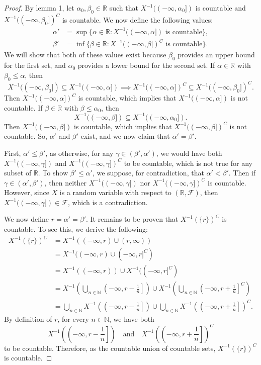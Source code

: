 \documentclass[12pt]{article}
\newcommand{\isp}[1]{\quad\text{#1}\quad}
\newcommand{\N}{\mathbb{N}}
\newcommand{\R}{\mathbb{R}}
\newcommand{\FF}{\mathcal{F}}
\begin{document}
\begin{proof}
    By lemma 1, let $\alpha_0,\beta_0\in\R$ such that $X^{-1}((-\infty,\alpha_0])$ is countable and $X^{-1}((-\infty,\beta_0])^C$ is countable. We now define the following values:
    \begin{align*}
        \alpha' &= \sup\{\alpha\in\R : X^{-1}((-\infty,\alpha]) \text{ is countable}\}, \\
        \beta' &= \inf\{\beta\in\R : X^{-1}((-\infty,\beta])^C \text{ is countable}\}.
    \end{align*}
    We will show that both of these values exist because $\beta_0$ provides an upper bound for the first set, and $\alpha_0$ provides a lower bound for the second set. If $\alpha\in\R$ with $\beta_0\leq \alpha$, then
    \[X^{-1}((-\infty,\beta_0]) \subseteq X^{-1}((-\infty,\alpha]) \implies X^{-1}((-\infty,\alpha])^C \subseteq X^{-1}((-\infty,\beta_0])^C.\]
    Then $X^{-1}((-\infty,\alpha])^C$ is countable, which implies that $X^{-1}((-\infty,\alpha])$ is not countable. If $\beta\in\R$ with $\beta\leq \alpha_0$, then
    \[X^{-1}((-\infty,\beta]) \subseteq X^{-1}((-\infty,\alpha_0]).\]
    Then $X^{-1}((-\infty,\beta])$ is countable, which implies that $X^{-1}((-\infty,\beta])^C$ is not countable. So, $\alpha'$ and $\beta'$ exist, and we now claim that $\alpha'=\beta'$.
    
    First, $\alpha'\leq \beta'$, as otherwise, for any $\gamma\in(\beta',\alpha')$, we would have both $X^{-1}((-\infty,\gamma])$ and $X^{-1}((-\infty,\gamma])^C$ to be countable, which is not true for any subset of $\R$. To show $\beta'\leq\alpha'$, we suppose, for contradiction, that $\alpha'<\beta'$. Then if $\gamma\in(\alpha',\beta')$, then neither $X^{-1}((-\infty,\gamma])$ nor $X^{-1}((-\infty,\gamma])^C$ is countable. However, since $X$ is a random variable with respect to $(\R,\FF)$, then $X^{-1}((-\infty,\gamma])\in\FF$, which is a contradiction.
    
    We now define $r=\alpha'=\beta'$. It remains to be proven that $X^{-1}(\{r\})^C$ is countable. To see this, we derive the following:
    \begin{align*}
        X^{-1}(\{r\})^C 
            &= X^{-1}((-\infty,r)\cup(r,\infty)) \\
            &= X^{-1}((-\infty,r)\cup(-\infty,r]^C) \\
            &= X^{-1}((-\infty,r))\cup X^{-1}((-\infty,r]^C) \\
            &= X^{-1}\left(\bigcup_{n\in\N}\left(-\infty,r-\frac1n\right]\right) \cup X^{-1}\left(\bigcup_{n\in\N}\left(-\infty, r+\frac1n\right]^C\right) \\
            &= \bigcup_{n\in\N}X^{-1}\left(\left(-\infty,r-\frac1n\right]\right)\cup \bigcup_{n\in\N}X^{-1}\left(\left(-\infty, r+\frac1n\right]\right)^C.
    \end{align*}
    By definition of $r$, for every $n\in\N$, we have both
    \[X^{-1}\left(\left(-\infty,r-\frac1n\right]\right) \isp{and} X^{-1}\left(\left(-\infty, r+\frac1n\right]\right)^C\]
    to be countable. Therefore, as the countable union of countable sets, $X^{-1}(\{r\})^C$ is countable.

\end{proof}
\end{document}

